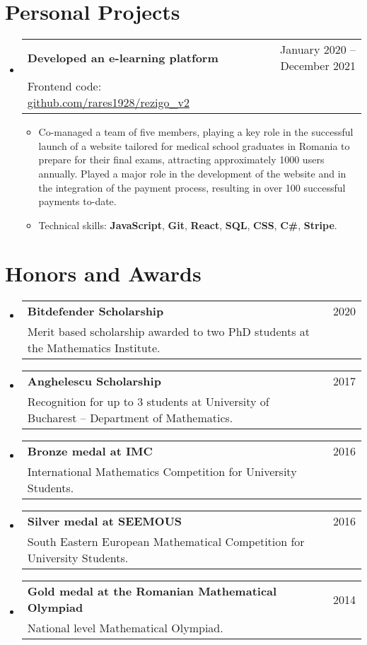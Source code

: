 \documentclass[a4paper, 11pt]{article}
\makeatletter
\newcommand{\CVItem}[1]{
  \item{
    {#1 \vspace{-2pt}}
  }
}
\newcommand{\CVSubheading}[4]{
  \vspace{-2pt}\item
    \begin{tabular*}{0.97\textwidth}[t]{l@{\extracolsep{\fill}}r}
      \textbf{#1} & #2 \\
      #3 & \ #4 \\
    \end{tabular*}\vspace{-7pt}
}
\newcommand{\CVSubHeadingListStart}{\begin{itemize}[leftmargin=0.5cm, label={}]}
\newcommand{\CVSubHeadingListEnd}{\end{itemize}}
\newcommand{\CVItemListStart}{\begin{itemize}}
\newcommand{\CVItemListEnd}{\end{itemize}\vspace{-5pt}}
\makeatother
\begin{document}
\section{Personal Projects}
  \CVSubHeadingListStart
    \CVSubheading
      {Developed an e-learning platform}{January 2020 -- December 2021}
		{Frontend code: \href{https://github.com/rares1928/rezigo_v2}{github.com/rares1928/rezigo\_v2}}{}
      \CVItemListStart
      \CVItem{Co-managed a team of five members, playing a key role in the successful launch of a website tailored for medical school graduates in Romania to prepare for their final exams, attracting approximately 1000 users annually. Played a major role in the development of the website and in the integration of the payment process, resulting in over 100 successful payments to-date.}
      \CVItem{Technical skills: \textbf{JavaScript}, \textbf{Git}, \textbf{React}, \textbf{SQL}, \textbf{CSS}, \textbf{C\#}, \textbf{Stripe}.}
      \CVItemListEnd
  \CVSubHeadingListEnd


\section{Honors and Awards}
  \CVSubHeadingListStart
    \CVSubheading
      {Bitdefender Scholarship}{2020}
      {Merit based scholarship awarded to two PhD students at the Mathematics Institute.}{}
      \CVSubheading
      {Anghelescu Scholarship}{2017}
      {Recognition for up to 3 students at University of Bucharest -- Department of Mathematics.}{}
      \CVSubheading
      {Bronze medal at IMC}{2016}
      {International Mathematics Competition
for University Students.}{}
    \CVSubheading
      {Silver medal at SEEMOUS}{2016}
      {South Eastern European Mathematical Competition for University Students.}{}
    \CVSubheading
      {Gold medal at the Romanian Mathematical Olympiad}{2014}
      {National level Mathematical Olympiad.}{}

  \CVSubHeadingListEnd



\begin{comment}
This section is compressed from the various skills sections that Euro CV
recommends.
\end{comment}
\end{document}

